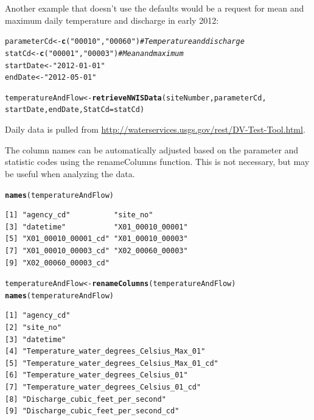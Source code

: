 \documentclass[a4paper,11pt]{article}\usepackage[]{graphicx}\usepackage[]{color}
\makeatletter
\newcommand{\hlstr}[1]{\textcolor[rgb]{0.192,0.494,0.8}{#1}}%
\newcommand{\hlcom}[1]{\textcolor[rgb]{0.678,0.584,0.686}{\textit{#1}}}%
\newcommand{\hlstd}[1]{\textcolor[rgb]{0.345,0.345,0.345}{#1}}%
\newcommand{\hlkwb}[1]{\textcolor[rgb]{0.69,0.353,0.396}{#1}}%
\newcommand{\hlkwc}[1]{\textcolor[rgb]{0.333,0.667,0.333}{#1}}%
\newcommand{\hlkwd}[1]{\textcolor[rgb]{0.737,0.353,0.396}{\textbf{#1}}}%
\newenvironment{kframe}{%
 \def\at@end@of@kframe{}%
 \ifinner\ifhmode%
  \def\at@end@of@kframe{\end{minipage}}%
  \begin{minipage}{\columnwidth}%
 \fi\fi%
 \def\FrameCommand##1{\hskip\@totalleftmargin \hskip-\fboxsep
 \colorbox{shadecolor}{##1}\hskip-\fboxsep
     \hskip-\linewidth \hskip-\@totalleftmargin \hskip\columnwidth}%
 \MakeFramed {\advance\hsize-\width
   \@totalleftmargin\z@ \linewidth\hsize
   \@setminipage}}%
 {\par\unskip\endMakeFramed%
 \at@end@of@kframe}
\newenvironment{knitrout}{}{} %
\makeatother
\begin{document}
Another example that doesn't use the defaults would be a request for mean and maximum daily temperature and discharge in early 2012:
\begin{knitrout}
\color{fgcolor}\begin{kframe}
\begin{alltt}
\hlstd{parameterCd} \hlkwb{<-} \hlkwd{c}\hlstd{(}\hlstr{"00010"}\hlstd{,}\hlstr{"00060"}\hlstd{)}  \hlcom{# Temperature and discharge}
\hlstd{statCd} \hlkwb{<-} \hlkwd{c}\hlstd{(}\hlstr{"00001"}\hlstd{,}\hlstr{"00003"}\hlstd{)}  \hlcom{# Mean and maximum}
\hlstd{startDate} \hlkwb{<-} \hlstr{"2012-01-01"}
\hlstd{endDate} \hlkwb{<-} \hlstr{"2012-05-01"}

\hlstd{temperatureAndFlow} \hlkwb{<-} \hlkwd{retrieveNWISData}\hlstd{(siteNumber, parameterCd,}
        \hlstd{startDate, endDate,} \hlkwc{StatCd}\hlstd{=statCd)}
\end{alltt}
\end{kframe}
\end{knitrout}


Daily data is pulled from \url{http://waterservices.usgs.gov/rest/DV-Test-Tool.html}. 

The column names can be automatically adjusted based on the parameter and statistic codes using the renameColumns function. This is not necessary, but may be useful when analyzing the data. 

\begin{knitrout}
\color{fgcolor}\begin{kframe}
\begin{alltt}
\hlkwd{names}\hlstd{(temperatureAndFlow)}
\end{alltt}
\begin{verbatim}
[1] "agency_cd"          "site_no"           
[3] "datetime"           "X01_00010_00001"   
[5] "X01_00010_00001_cd" "X01_00010_00003"   
[7] "X01_00010_00003_cd" "X02_00060_00003"   
[9] "X02_00060_00003_cd"
\end{verbatim}
\begin{alltt}
\hlstd{temperatureAndFlow} \hlkwb{<-} \hlkwd{renameColumns}\hlstd{(temperatureAndFlow)}
\hlkwd{names}\hlstd{(temperatureAndFlow)}
\end{alltt}
\begin{verbatim}
[1] "agency_cd"                                  
[2] "site_no"                                    
[3] "datetime"                                   
[4] "Temperature_water_degrees_Celsius_Max_01"   
[5] "Temperature_water_degrees_Celsius_Max_01_cd"
[6] "Temperature_water_degrees_Celsius_01"       
[7] "Temperature_water_degrees_Celsius_01_cd"    
[8] "Discharge_cubic_feet_per_second"            
[9] "Discharge_cubic_feet_per_second_cd"         
\end{verbatim}
\end{kframe}
\end{knitrout}
\end{document}

